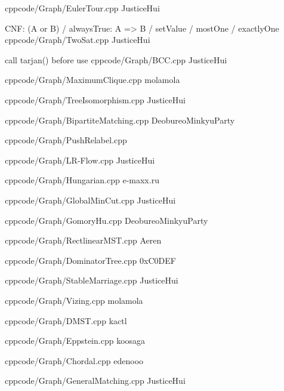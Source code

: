 \documentclass[landscape, 8pt, a4paper, oneside, twocolumn]{extarticle}
\begin{document}
{}{}
{cpp}{code/Graph/EulerTour.cpp}
{JusticeHui}

{CNF: (A or B) / alwaysTrue: A => B / setValue / mostOne / exactlyOne}{}
{cpp}{code/Graph/TwoSat.cpp}
{JusticeHui}

{call tarjan() before use}{}
{cpp}{code/Graph/BCC.cpp}
{JusticeHui}

{}{}
{cpp}{code/Graph/MaximumClique.cpp}
{molamola}

{}{}
{cpp}{code/Graph/TreeIsomorphism.cpp}
{JusticeHui}

{}{}
{cpp}{code/Graph/BipartiteMatching.cpp}
{DeobureoMinkyuParty}



{}{}
{cpp}{code/Graph/PushRelabel.cpp}
{}

{}{}
{cpp}{code/Graph/LR-Flow.cpp}
{JusticeHui}

{}{}
{cpp}{code/Graph/Hungarian.cpp}
{e-maxx.ru}

{}{}
{cpp}{code/Graph/GlobalMinCut.cpp}
{JusticeHui}

{}{}
{cpp}{code/Graph/GomoryHu.cpp}
{DeobureoMinkyuParty}

{}{}
{cpp}{code/Graph/RectlinearMST.cpp}
{Aeren}

{}{}
{cpp}{code/Graph/DominatorTree.cpp}
{0xC0DEF}

{}{}
{cpp}{code/Graph/StableMarriage.cpp}
{JusticeHui}

{}{}
{cpp}{code/Graph/Vizing.cpp}
{molamola}

{}{}
{cpp}{code/Graph/DMST.cpp}
{kactl}

{}{}
{cpp}{code/Graph/Eppstein.cpp}
{koosaga}

{}{}
{cpp}{code/Graph/Chordal.cpp}
{edenooo}

{}{}
{cpp}{code/Graph/GeneralMatching.cpp}
{JusticeHui}
\end{document}
